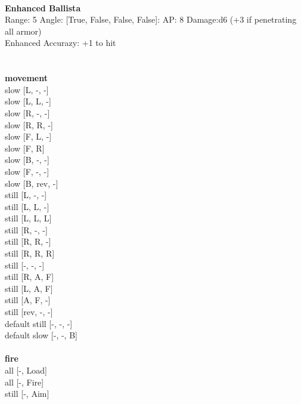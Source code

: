 \ \\
{\bf Enhanced Ballista } \\



Range: 5  Angle: [True, False, False, False]: AP: 8 Damage:d6 (+3 if penetrating all armor) \\
Enhanced Accurazy: +1 to hit\\ 




 
\ \\



\ \\ {\bf movement } \\
slow [L, -, -] \\
slow [L, L, -] \\
slow [R, -, -] \\
slow [R, R, -] \\
slow [F, L, -] \\
slow [F, R] \\
slow [B, -, -] \\
slow [F, -, -] \\
slow [B, rev, -] \\
still [L, -, -] \\
still [L, L, -] \\
still [L, L, L] \\
still [R, -, -] \\
still [R, R, -] \\
still [R, R, R] \\
still [-, -, -] \\
still [R, A, F] \\
still [L, A, F] \\
still [A, F, -] \\
still [rev, -, -] \\
default still [-, -, -] \\
default slow [-, -, B] \\
\ \\ {\bf fire } \\
all [-, Load] \\
all [-, Fire] \\
still [-, Aim] \\


